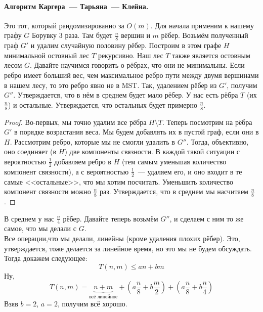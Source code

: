 \documentclass{article}
\begin{document}
    \paragraph{Алгоритм Каргера~--- Тарьяна~--- Клейна.}
    Это тот, который рандомизированно за $O(m)$. Для начала применим к нашему графу $G$ Борувку 3 раза. Там будет $\frac n8$ вершин и $m$ рёбер. Возьмём полученный граф $G'$ и удалим случайную половину рёбер. Построим в этом графе $H$ минимальной остовный лес $T$ рекурсивно. Наш лес $T$ также является остовным лесом $G$. Давайте научимся говорить о рёбрах, что они не минимальны. Если ребро имеет больший вес, чем максимальное ребро пути между двумя вершинами в нашем лесу, то это ребро явно не в MST. Так, удалением рёбер из $G'$, получим $G''$. Утверждается, что в нём в среднем будет мало рёбер. У нас есть рёбра $T$ (их $\frac n8$) и остальные. Утверждается, что остальных будет примерно $\frac n8$.
    \begin{proof}
        Во-первых, мы точно удалим все рёбра $H\setminus T$. Теперь посмотрим на рёбра $G'$ в порядке возрастания веса. Мы будем добавлять их в пустой граф, если они в $H$. Рассмотрим ребро, которые мы не смогли удалить в $G''$. Тогда, объективно, оно соединяет (в $H$) две компоненты связности. В каждой такой ситуации с вероятностью $\frac12$ добавляем ребро в $H$ (тем самым уменьшая количество компонент связности), а с вероятностью $\frac12$~--- удаляем его, и оно входит в те самые <<остальные>>, что мы хотим посчитать. Уменьшить количество компонент связности можно $\frac n8$ раз. Утверждается, что в среднем мы насчитаем $\frac n8$.
    \end{proof}
    В среднем у нас $\frac n4$ рёбер. Давайте теперь возьмём $G''$, и сделаем с ним то же самое, что мы делали с $G$.\\
    Все операции,что мы делали, линейны (кроме удаления плохих рёбер). Это, утверждается, тоже делается за линейное время, но это мы не будем обсуждать. Тогда докажем следующее:
    $$
    T(n,m)\leqslant an+bm
    $$
    Ну,
    $$
    T(n,m)=\underbrace{n+m}_{\text{всё линейное}}+\left(a\frac n8+b\frac m2\right)+\left(a\frac n8+b\frac n4\right)
    $$
    Взяв $b=2$, $a=2$, получим всё хорошо.
\end{document}
